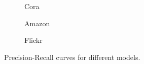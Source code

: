 \documentclass[pdflatex,sn-mathphys-num]{sn-jnl}%
\theoremstyle{thmstyleone}%
\theoremstyle{thmstyletwo}%
\theoremstyle{thmstylethree}%
\begin{document}

\vspace*{-17pt}
\begin{figure}[H]
    \centering
    \begin{subfigure}{0.32\textwidth}
        \resizebox{\linewidth}{!}{}
        \caption{Cora}
    \end{subfigure}
    \begin{subfigure}{0.32\textwidth}
        \resizebox{\linewidth}{!}{}
        \caption{Amazon}
    \end{subfigure}
    \begin{subfigure}{0.32\textwidth}
        \resizebox{\linewidth}{!}{}
        \caption{Flickr}
    \end{subfigure}
    \caption{\small Precision-Recall curves for different models.}
    \label{fig:pr_curve}
\end{figure}
\vspace*{-47pt}
\end{document}
